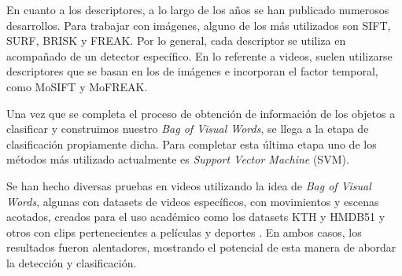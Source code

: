 En cuanto a los descriptores, a lo largo de los años se han publicado numerosos desarrollos. Para trabajar con imágenes, alguno de los más utilizados
son SIFT\parencite{lowe2004distinctive}, SURF\parencite{bay2006surf}, BRISK\parencite{leutenegger2011brisk} y FREAK\parencite{alahi2012freak}.
Por lo general, cada descriptor se utiliza en acompañado de un detector específico.
En lo referente a videos, suelen utilizarse descriptores que se basan en los de imágenes e incorporan el factor temporal,
como MoSIFT\parencite{chen2009mosift} y MoFREAK\parencite{whiten2013mofreak}.

Una vez que se completa el proceso de obtención de información de los objetos a clasificar y construimos nuestro \textit{Bag of Visual
Words}, se llega a la etapa de clasificación propiamente dicha. Para completar esta última etapa uno de los métodos más utilizado
actualmente es \textit{Support Vector Machine} (SVM).

Se han hecho diversas pruebas en videos utilizando la idea de \textit{Bag of Visual Words}, algunas con
datasets de videos específicos, con movimientos y escenas acotados, creados para el uso académico como los datasets KTH\parencite{schuldt2004recognizing}
y HMDB51\parencite{kuehne2011hmdb}\parencite{whiten2013mofreak} y otros con clips pertenecientes a películas y deportes
\parencite{chen2011violence, nievas2011violence, deniz2014fast}. En ambos casos, los resultados fueron alentadores, mostrando el
potencial de esta manera de abordar la detección y clasificación.